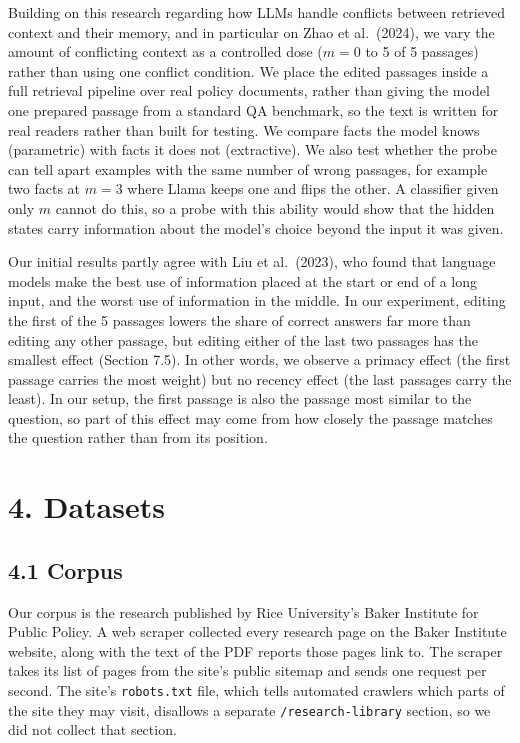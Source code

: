 \documentclass[
  12pt,
  letterpaper,
]{article}
\begin{document}
Building on this research regarding how LLMs
handle conflicts between retrieved context and
their memory, and in particular on Zhao et
al.~(2024), we vary the amount of conflicting
context as a controlled dose (\(m = 0\) to 5 of 5
passages) rather than using one conflict
condition. We place the edited passages inside a
full retrieval pipeline over real policy
documents, rather than giving the model one
prepared passage from a standard QA benchmark, so
the text is written for real readers rather than
built for testing. We compare facts the model
knows (parametric) with facts it does not
(extractive). We also test whether the probe can
tell apart examples with the same number of wrong
passages, for example two facts at \(m = 3\) where
Llama keeps one and flips the other. A classifier
given only \(m\) cannot do this, so a probe with
this ability would show that the hidden states
carry information about the model's choice beyond
the input it was given.

Our initial results partly agree with Liu et
al.~(2023), who found that language models make
the best use of information placed at the start or
end of a long input, and the worst use of
information in the middle. In our experiment,
editing the first of the 5 passages lowers the
share of correct answers far more than editing any
other passage, but editing either of the last two
passages has the smallest effect (Section 7.5). In
other words, we observe a primacy effect (the
first passage carries the most weight) but no
recency effect (the last passages carry the
least). In our setup, the first passage is also
the passage most similar to the question, so part
of this effect may come from how closely the
passage matches the question rather than from its
position.

\section{4. Datasets}\label{datasets}

\subsection{4.1 Corpus}\label{corpus}

Our corpus is the research published by Rice
University's Baker Institute for Public Policy. A
web scraper collected every research page on the
Baker Institute website, along with the text of
the PDF reports those pages link to. The scraper
takes its list of pages from the site's public
sitemap and sends one request per second. The
site's \texttt{robots.txt} file, which tells
automated crawlers which parts of the site they
may visit, disallows a separate
\texttt{/research-library} section, so we did not
collect that section.
\end{document}
